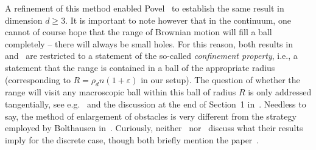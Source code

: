 \documentclass[10pt]{amsart}
\theoremstyle{definition}\newtheorem{defi}[theo]{Definition}\newtheorem{rema}[theo]{Remark}\newtheorem{exam}[theo]{Example}\newtheorem{exem}[theo]{Example}\newtheorem{nota}[theo]{Notation}
\newcommand*\eps{\varepsilon}
\begin{document}
A refinement of this method enabled Povel~\cite{Povel} to establish the same result in dimension $d \ge 3$. It is important to note however that in the continuum, one cannot of course hope that the range of Brownian motion will fill a ball completely -- there will always be small holes. For this reason, both results in~\cite{Sznitman} and~\cite{Povel} are restricted to a statement of the so-called \emph{confinement property}, i.e., a statement that the range is contained in a ball of the appropriate radius (corresponding to $R = \rho_d n (1+ \eps)$ in our setup). The question of whether the range will visit any macroscopic ball within this ball of radius $R$ is only addressed tangentially, see e.g.~\cite[Theorem~4.3]{Sznitman} and the discussion at the end of Section~1 in~\cite{Povel}. Needless to say, the method of enlargement of obstacles is very different from the strategy employed by Bolthausen in~\cite{BO}. Curiously, neither~\cite{Sznitman} nor~\cite{Povel} discuss what their results imply for the discrete case, though both briefly mention the paper~\cite{BO}.
\end{document}
